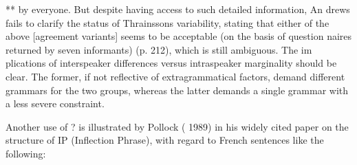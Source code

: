 \begin{styleStandard}
{\textquotedbl}**{\textquotedbl} by everyone. But despite having access to such detailed information, An\- drews fails to clarify the status of Thrainsson{\textquotesingle}s variability, stating that {\textquotedbl}either of the above [agreement variants] seems to be acceptable (on the basis of question\- naires returned by seven informants){\textquotedbl} (p. 212), which is still ambiguous. The im\- plications of interspeaker differences versus intraspeaker marginality should be clear. The former, if not reflective of extragrammatical factors, demand different grammars for the two groups, whereas the latter demands a single grammar with a less severe constraint.
\end{styleStandard}


\begin{styleStandard}
Another use of {\textquotedbl}?{\textquotedbl} is illustrated by Pollock ( 1989) in his widely cited paper on the structure of IP (Inflection Phrase), with regard to French sentences like the following:
\end{styleStandard}


